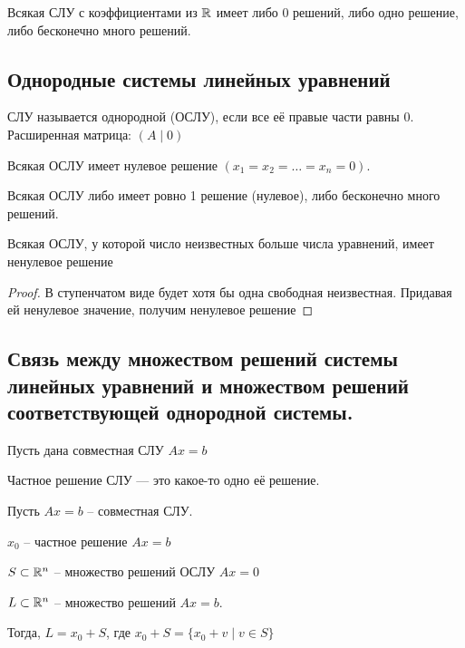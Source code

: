 \begin{corollary}
    Всякая СЛУ с коэффициентами из $\mathbb{R}$ имеет либо 0 решений, либо одно решение, либо бесконечно много решений.
\end{corollary}


\subsection{Однородные системы линейных уравнений}
\begin{definition}
    СЛУ называется однородной (ОСЛУ), если все её правые части равны 0. Расширенная матрица: $(A \mid 0)$
\end{definition}

\begin{fact}
    Всякая ОСЛУ имеет нулевое решение $(x_1 = x_2 = \dots = x_n = 0)$.
\end{fact}

\begin{corollary}
    Всякая ОСЛУ либо имеет ровно 1 решение (нулевое), либо бесконечно много решений.
\end{corollary}

\begin{corollary}
    Всякая ОСЛУ, у которой число неизвестных больше числа уравнений, имеет ненулевое решение
\end{corollary}

\begin{proof}
    В ступенчатом виде будет хотя бы одна свободная неизвестная. Придавая ей ненулевое значение, получим ненулевое решение
\end{proof}


\subsection{Связь между множеством решений системы линейных уравнений и множеством решений соответствующей однородной системы.}

Пусть дана совместная СЛУ $Ax = b$

Частное решение СЛУ --- это какое-то одно её решение.

\begin{proposition}
    Пусть $Ax = b$ -- совместная СЛУ.

    $x_0$ -- частное решение $Ax = b$

    $S \subset \mathbb{R}^n$ -- множество решений ОСЛУ $Ax = 0$

    $L \subset \mathbb{R}^n $ -- множество решений $Ax = b$.

    Тогда, $L = x_0 + S$, где $x_0 + S = \{x_0 + v \mid v \in S\}$
\end{proposition}


